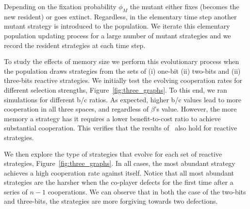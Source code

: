\documentclass{article}
\theoremstyle{definition}
\begin{document}
Depending on the fixation probability \(\phi_{M}\) the mutant either fixes
(becomes the new resident) or goes extinct. Regardless, in the elementary time
step another mutant strategy is introduced to the  population. We iterate this
elementary population updating process for a large number of mutant strategies
and we record the resident strategies at each time step.

To study the effects of memory size we perform this evolutionary process when
the population draws strategies from the sets of (i) one-bit (ii) two-bits and
(ii) three-bits reactive strategies. We initially test the evolving cooperation
rates for different selection strengths, Figure~\ref{fig:three_graphs}. To this end, we ran simulations for
different b/c ratios. As expected, higher b/c values lead to more cooperation in
all three spaces, and regardless of \(\beta\)'s value. However, the more memory
a strategy has it requires a lower benefit-to-cost ratio to achieve substantial
cooperation. This verifies that the results of~\citep{hilbe:PNAS:2017} also
hold for reactive strategies.

We then explore the type of strategies that evolve for each set of reactive
strategies, Figure~\ref{fig:three_graphs}. In all cases, the most abundant
strategy achieves a high cooperation rate against itself. Notice that all most
abundant strategies are the harsher when the co-player defects for the first
time after a series of \(n - 1\) cooperations. We can observe that in both the
case of the two-bits and three-bits, the strategies are more forgiving towards
two defections.
\end{document}

